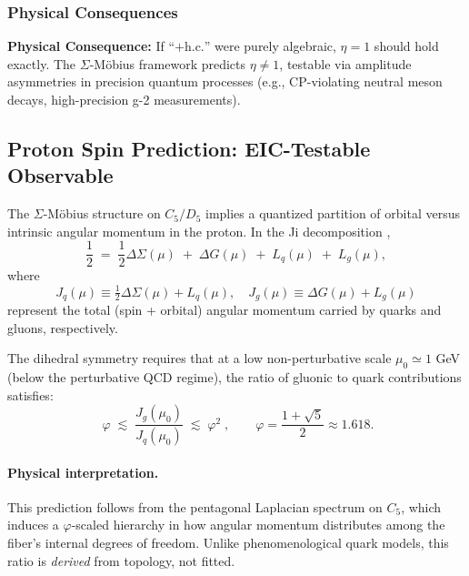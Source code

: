\documentclass[12pt]{article}
\begin{document}
\subsubsection{Physical Consequences}

\textbf{Physical Consequence:} If ``$+ \text{h.c.}$'' were purely algebraic, $\eta=1$ should hold exactly. The $\Sigma$-M\"obius framework predicts $\eta \neq 1$, testable via amplitude asymmetries in precision quantum processes (e.g., CP-violating neutral meson decays, high-precision g-2 measurements).

\subsection{Proton Spin Prediction: EIC-Testable Observable}
\label{sec:proton_spin}

The $\Sigma$-M\"obius structure on $C_5/D_5$ implies a quantized partition of orbital versus intrinsic angular momentum in the proton. In the Ji decomposition \cite{ji2020proton},
\begin{equation}
\frac{1}{2} \;=\; \frac{1}{2}\Delta\Sigma(\mu) \;+\; \Delta G(\mu) \;+\; L_q(\mu) \;+\; L_g(\mu),
\end{equation}
where
\begin{equation}
J_q(\mu) \equiv \tfrac{1}{2}\Delta\Sigma(\mu) + L_q(\mu),\quad
J_g(\mu) \equiv \Delta G(\mu) + L_g(\mu)
\end{equation}
represent the total (spin + orbital) angular momentum carried by quarks and gluons, respectively.

The dihedral symmetry requires that at a low non-perturbative scale $\mu_0 \simeq 1$ GeV (below the perturbative QCD regime), the ratio of gluonic to quark contributions satisfies:
\begin{equation}
\boxed{\;\varphi \;\lesssim\; \frac{J_g(\mu_0)}{J_q(\mu_0)} \;\lesssim\; \varphi^2\;},\qquad 
\varphi=\frac{1+\sqrt{5}}{2} \approx 1.618.
\label{eq:proton_spin_band}
\end{equation}

\paragraph{Physical interpretation.} This prediction follows from the pentagonal Laplacian spectrum on $C_5$, which induces a $\varphi$-scaled hierarchy in how angular momentum distributes among the fiber's internal degrees of freedom. Unlike phenomenological quark models, this ratio is \emph{derived} from topology, not fitted.
\end{document}
